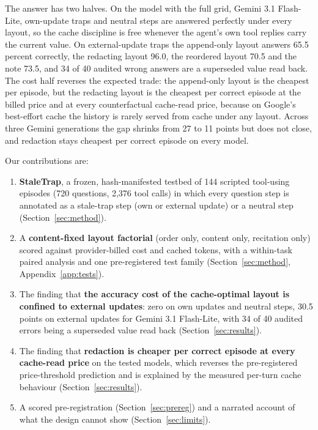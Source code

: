 The answer has two halves. On the model with the full grid, Gemini 3.1 Flash-Lite, own-update traps and neutral steps are answered perfectly under every layout, so the cache discipline is free whenever the agent's own tool replies carry the current value. On external-update traps the append-only layout answers 65.5 percent correctly, the redacting layout 96.0, the reordered layout 70.5 and the note 73.5, and 34 of 40 audited wrong answers are a superseded value read back. The cost half reverses the expected trade: the append-only layout is the cheapest per episode, but the redacting layout is the cheapest per correct episode at the billed price and at every counterfactual cache-read price, because on Google's best-effort cache the history is rarely served from cache under any layout. Across three Gemini generations the gap shrinks from 27 to 11 points but does not close, and redaction stays cheapest per correct episode on every model.

Our contributions are:
\begin{enumerate}
\item \textbf{StaleTrap}, a frozen, hash-manifested testbed of 144 scripted tool-using episodes (720 questions, 2,376 tool calls) in which every question step is annotated as a stale-trap step (own or external update) or a neutral step (Section~\ref{sec:method}).
\item A \textbf{content-fixed layout factorial} (order only, content only, recitation only) scored against provider-billed cost and cached tokens, with a within-task paired analysis and one pre-registered test family (Section~\ref{sec:method}, Appendix~\ref{app:tests}).
\item The finding that \textbf{the accuracy cost of the cache-optimal layout is confined to external updates}: zero on own updates and neutral steps, 30.5 points on external updates for Gemini 3.1 Flash-Lite, with 34 of 40 audited errors being a superseded value read back (Section~\ref{sec:results}).
\item The finding that \textbf{redaction is cheaper per correct episode at every cache-read price} on the tested models, which reverses the pre-registered price-threshold prediction and is explained by the measured per-turn cache behaviour (Section~\ref{sec:results}).
\item A scored pre-registration (Section~\ref{sec:prereg}) and a narrated account of what the design cannot show (Section~\ref{sec:limits}).
\end{enumerate}

